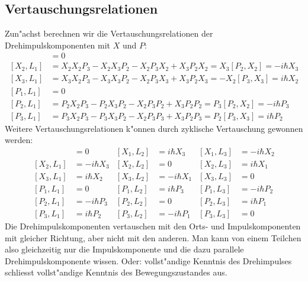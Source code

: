 \subsection{Vertauschungsrelationen}
Zun"achst berechnen wir die Vertauschungsrelationen der
Drehimpulskomponenten mit $X$ und $P$:
\begin{align*}
[X_1,L_1]&=0\\
[X_2,L_1]
&=
X_2X_2P_3-X_2X_3P_2-X_2P_3X_2+X_3P_2X_2
=X_3[P_2,X_2]
=-i\hbar X_3
\\
[X_3,L_1]
&=
X_3X_2P_3-X_3X_3P_2-X_2P_3X_3+X_3P_2X_3
=
-X_2[P_3,X_3]
=
i\hbar X_2
\\
[P_1,L_1]&=0\\
[P_2,L_1]
&=
P_2X_2P_3 - P_2X_3P_2 - X_2P_3P_2 + X_3P_2P_2
=
P_3[P_2,X_2]
=
-i\hbar P_3
\\
[P_3,L_1]
&=
P_3X_2P_3 - P_3X_3P_2 - X_2P_3P_3 + X_3P_2P_3
=
P_2[P_3,X_3]=i\hbar P_2
\end{align*}
Weitere Vertauschungsrelationen k"onnen durch zyklische Vertauschung
gewonnen werden:
\begin{align*}
[X_1,L_1] &= 0          & [X_1,L_2] &= i\hbar X_3 & [X_1,L_3] &=-i\hbar X_2\\
[X_2,L_1] &=-i\hbar X_3 & [X_2,L_2] &= 0          & [X_2,L_3] &= i\hbar X_1\\
[X_3,L_1] &= i\hbar X_2 & [X_3,L_2] &=-i\hbar X_1 & [X_3,L_3] &= 0         \\
[P_1,L_1] &= 0          & [P_1,L_2] &= i\hbar P_3 & [P_1,L_3] &=-i\hbar P_2\\
[P_2,L_1] &=-i\hbar P_3 & [P_2,L_2] &= 0          & [P_2,L_3] &= i\hbar P_1\\
[P_3,L_1] &= i\hbar P_2 & [P_3,L_2] &=-i\hbar P_1 & [P_3,L_3] &= 0
\end{align*}
Die Drehimpulskomponenten vertauschen mit den Orts- und Impulskomponenten
mit gleicher Richtung, aber nicht mit den anderen.
Man kann von einem Teilchen also gleichzeitig nur die Impulskomponente
und die dazu parallele Drehimpulskomponente wissen. 
Oder: vollst"andige Kenntnis des Drehimpulses schliesst vollst"andige
Kenntnis des Bewegungszustandes aus.

